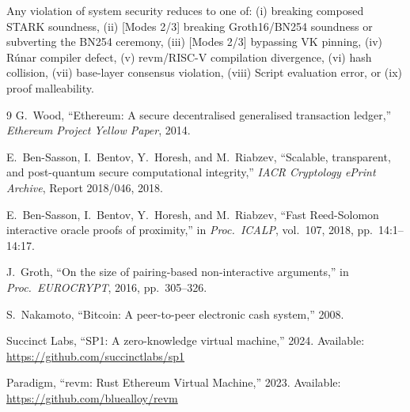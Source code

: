 \documentclass[11pt,a4paper]{article}
\newcommand{\revm}{\textsf{revm}}
\newcommand{\Runar}{\textsf{R\'{u}nar}}
\begin{document}
Any violation of system security reduces to one of: (i) breaking composed STARK soundness, (ii) [Modes 2/3] breaking Groth16/BN254 soundness or subverting the BN254 ceremony, (iii) [Modes 2/3] bypassing VK pinning, (iv) \Runar{} compiler defect, (v) \revm{}/RISC-V compilation divergence, (vi) hash collision, (vii) base-layer consensus violation, (viii) Script evaluation error, or (ix) proof malleability.


\begin{thebibliography}{9}
G.~Wood, ``Ethereum: A secure decentralised generalised transaction ledger,'' \emph{Ethereum Project Yellow Paper}, 2014.

E.~Ben-Sasson, I.~Bentov, Y.~Horesh, and M.~Riabzev, ``Scalable, transparent, and post-quantum secure computational integrity,'' \emph{IACR Cryptology ePrint Archive}, Report 2018/046, 2018.

E.~Ben-Sasson, I.~Bentov, Y.~Horesh, and M.~Riabzev, ``Fast Reed-Solomon interactive oracle proofs of proximity,'' in \emph{Proc.\ ICALP}, vol.~107, 2018, pp.~14:1--14:17.

J.~Groth, ``On the size of pairing-based non-interactive arguments,'' in \emph{Proc.\ EUROCRYPT}, 2016, pp.~305--326.

S.~Nakamoto, ``Bitcoin: A peer-to-peer electronic cash system,'' 2008.

Succinct Labs, ``SP1: A zero-knowledge virtual machine,'' 2024. Available: \url{https://github.com/succinctlabs/sp1}

Paradigm, ``revm: Rust Ethereum Virtual Machine,'' 2023. Available: \url{https://github.com/bluealloy/revm}
\end{thebibliography}
\end{document}
